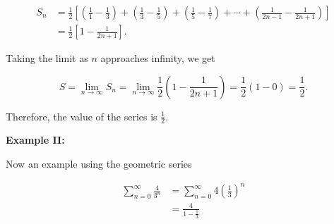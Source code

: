 \begin{align*}
    S_n &= \frac{1}{2} \left[ \left( \frac{1}{1} - \frac{1}{3} \right) + \left( \frac{1}{3} - \frac{1}{5} \right) + \left( \frac{1}{5} - \frac{1}{7} \right) + \cdots + \left( \frac{1}{2n - 1} - \frac{1}{2n + 1} \right) \right] \\
    &= \frac{1}{2} \left[ 1 - \frac{1}{2n + 1} \right].
\end{align*}

Taking the limit as \(n\) approaches infinity, we get

\[
    S = \lim_{n \to \infty} S_n = \lim_{n \to \infty} \frac{1}{2} \left( 1 - \frac{1}{2n + 1} \right) = \frac{1}{2} (1 - 0) = \frac{1}{2}.
\]

Therefore, the value of the series is \(\frac{1}{2}\).

\textbf{Example II:}

Now an example using the geometric series

\begin{align*}
    \sum_{n = 0}^{\infty} \frac{4}{3^n} &=  \sum_{n = 0}^{\infty} 4 \left(\frac{1}{3}\right)^n \\
    &= \frac{4}{1 - \frac{1}{3}}
\end{align*}
